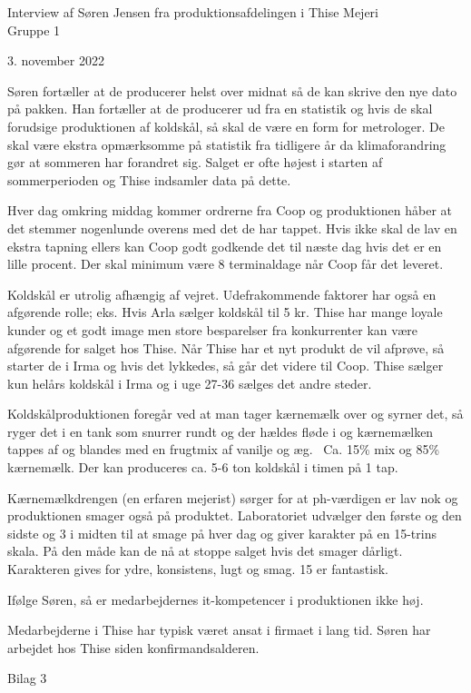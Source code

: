 \documentclass[
  12pt,
  a4paper,
  DIV=11,
  numbers=noendperiod]{scrartcl}
\begin{document}
Interview af Søren Jensen fra produktionsafdelingen i Thise Mejeri ~\\
Gruppe 1~

3. november 2022~

Søren fortæller at de producerer helst over midnat så de kan skrive den
nye dato på pakken. Han fortæller at de producerer ud fra en statistik
og hvis de skal forudsige produktionen af koldskål, så skal de være en
form for metrologer. De skal være ekstra opmærksomme på statistik fra
tidligere år da klimaforandring gør at sommeren har forandret sig.
Salget er ofte højest i starten af sommerperioden og Thise indsamler
data på dette.

Hver dag omkring middag kommer ordrerne fra Coop og produktionen håber
at det stemmer nogenlunde overens med det de har tappet. Hvis ikke skal
de lav en ekstra tapning ellers kan Coop godt godkende det til næste dag
hvis det er en lille procent. Der skal minimum være 8 terminaldage når
Coop får det leveret.~~

Koldskål er utrolig afhængig af vejret. Udefrakommende faktorer har også
en afgørende rolle; eks. Hvis Arla sælger koldskål til 5 kr. Thise har
mange loyale kunder og et godt image men store besparelser fra
konkurrenter kan være afgørende for salget hos Thise. Når Thise har et
nyt produkt de vil afprøve, så starter de i Irma og hvis det lykkedes,
så går det videre til Coop. Thise sælger kun helårs koldskål i Irma og i
uge 27-36 sælges det andre steder.~~

Koldskålproduktionen foregår ved at man tager kærnemælk over og syrner
det, så ryger det i en tank som snurrer rundt og der hældes fløde i og
kærnemælken tappes af og blandes med en frugtmix af vanilje og æg.~ Ca.
15\% mix og 85\% kærnemælk. Der kan produceres ca. 5-6 ton koldskål i
timen på 1 tap.~~

Kærnemælkdrengen (en erfaren mejerist) sørger for at ph-værdigen er lav
nok og produktionen smager også på produktet. Laboratoriet udvælger den
første og den sidste og 3 i midten til at smage på hver dag og giver
karakter på en 15-trins skala. På den måde kan de nå at stoppe salget
hvis det smager dårligt. Karakteren gives for ydre, konsistens, lugt og
smag. 15 er fantastisk.~

Ifølge Søren, så er medarbejdernes it-kompetencer i produktionen ikke
høj.~

Medarbejderne i Thise har typisk været ansat i firmaet i lang tid. Søren
har arbejdet hos Thise siden konfirmandsalderen.~

Bilag 3~
\end{document}
